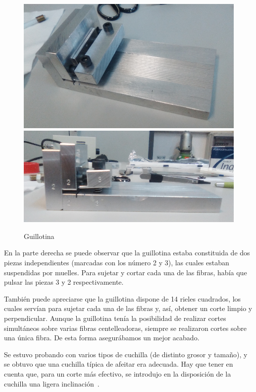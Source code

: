 \begin{figure}[htb]
\centering
{
\includegraphics[scale=0.22]{Guillotina1.png} 
}
{
\includegraphics[scale=0.3]{Guillotina2.png} 
}
\caption{Guillotina\label{Guillotina}}
\end{figure} 

En la parte derecha se puede observar que la guillotina estaba constituida de dos piezas independientes (marcadas con los número 2 y 3), las cuales estaban suspendidas por muelles. Para sujetar y cortar cada una de las fibras, había que pulsar las piezas 3 y 2 respectivamente. 

También puede apreciarse que la guillotina dispone de 14 rieles cuadrados, los cuales servían para sujetar cada una de las fibras y, así, obtener un corte limpio y perpendicular. Aunque la guillotina tenía la posibilidad de realizar cortes simultáneos sobre varias fibras centelleadoras, siempre se realizaron cortes sobre una única fibra. De esta forma asegurábamos un mejor acabado.

Se estuvo probando con varios tipos de cuchilla (de distinto grosor y tamaño),  y se obtuvo que una cuchilla típica de afeitar era adecuada. Hay que tener en cuenta que, para un corte más efectivo, se introdujo en la disposición de la cuchilla una ligera inclinación~\cite{Alberto, anguloytiempo}. 

